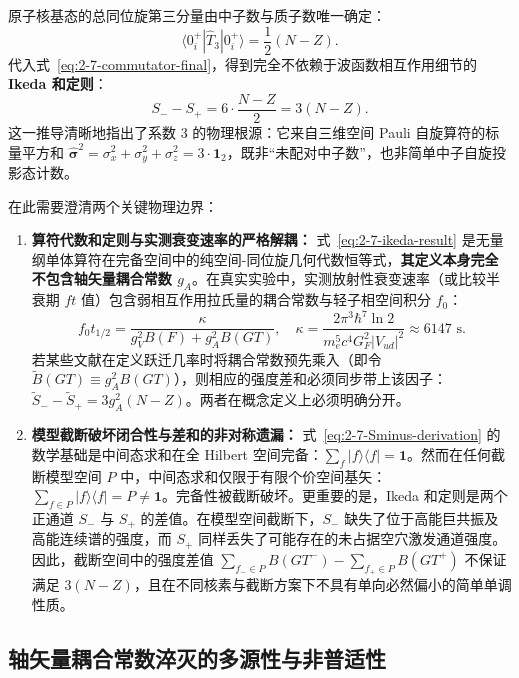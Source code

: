 原子核基态的总同位旋第三分量由中子数与质子数唯一确定：
\begin{equation*}
\langle 0^+_i | \hat{T}_3 | 0^+_i \rangle = \frac{1}{2}(N - Z) .
\end{equation*}
代入式~\eqref{eq:2-7-commutator-final}，得到完全不依赖于波函数相互作用细节的 \textbf{Ikeda 和定则}：
\begin{equation}\label{eq:2-7-ikeda-result}
S_- - S_+ = 6 \cdot \frac{N - Z}{2} = 3(N - Z).
\end{equation}
这一推导清晰地指出了系数 3 的物理根源：它来自三维空间 Pauli 自旋算符的标量平方和 $\hat{\boldsymbol{\sigma}}^2 = \sigma_x^2 + \sigma_y^2 + \sigma_z^2 = 3 \cdot \mathbf{1}_2$，既非“未配对中子数”，也非简单中子自旋投影态计数。

在此需要澄清两个关键物理边界：
\begin{enumerate}
\item \textbf{算符代数和定则与实测衰变速率的严格解耦：}
式~\eqref{eq:2-7-ikeda-result} 是无量纲单体算符在完备空间中的纯空间-同位旋几何代数恒等式，\textbf{其定义本身完全不包含轴矢量耦合常数 $g_A$}。在真实实验中，实测放射性衰变速率（或比较半衰期 $ft$ 值）包含弱相互作用拉氏量的耦合常数与轻子相空间积分 $f_0$：
\begin{equation}\label{eq:2-7-ft-value}
f_0 t_{1/2} = \frac{\kappa}{g_V^2 B(F) + g_A^2 B(GT)}, \quad \kappa = \frac{2\pi^3 \hbar^7 \ln 2}{m_e^5 c^4 G_F^2 |V_{ud}|^2} \approx 6147\text{ s}.
\end{equation}
若某些文献在定义跃迁几率时将耦合常数预先乘入（即令 $\widetilde{B}(GT) \equiv g_A^2 B(GT)$），则相应的强度差和必须同步带上该因子：$\widetilde{S}_- - \widetilde{S}_+ = 3 g_A^2 (N-Z)$。两者在概念定义上必须明确分开。
\item \textbf{模型截断破坏闭合性与差和的非对称遗漏：}
式~\eqref{eq:2-7-Sminus-derivation} 的数学基础是中间态求和在全 Hilbert 空间完备：$\sum_f |f\rangle \langle f| = \mathbf{1}$。然而在任何截断模型空间 $P$ 中，中间态求和仅限于有限个价空间基矢：$\sum_{f \in P} |f\rangle \langle f| = P \ne \mathbf{1}$。完备性被截断破坏。更重要的是，Ikeda 和定则是两个正通道 $S_-$ 与 $S_+$ 的差值。在模型空间截断下，$S_-$ 缺失了位于高能巨共振及高能连续谱的强度，而 $S_+$ 同样丢失了可能存在的未占据空穴激发通道强度。因此，截断空间中的强度差值 $\sum_{f_- \in P} B(GT^-) - \sum_{f_+ \in P} B(GT^+)$ 不保证满足 $3(N-Z)$，且在不同核素与截断方案下不具有单向必然偏小的简单单调性质。
\end{enumerate}

\subsection{轴矢量耦合常数淬灭的多源性与非普适性}\label{sec:2-7-5}

